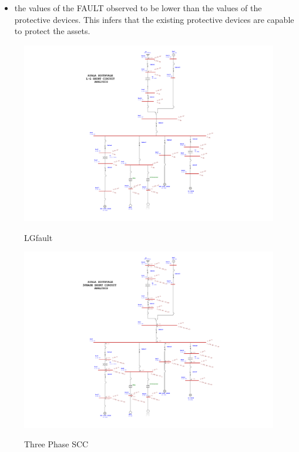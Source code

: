 \begin{itemize}
\item the values of the FAULT observed to be lower than the values of the protective devices. This infers that the existing protective devices are capable to protect the assets.
\end{itemize}

\begin{figure}
%	
	\includegraphics[width=\textwidth]{figures/ASV_shortcircuit_L_GFAULT.pdf} \\
	\caption{LGfault}
	\label{fig_ch04_elecaudit_scc_lgfault} 
\end{figure}

\begin{figure}
	\includegraphics[width=\textwidth]{figures/asv_shortcircuit_3PHASEFAULT.pdf} \\
	\caption{Three Phase SCC}
	\label{fig_ch04_elecaudit_scc_3phase} 
\end{figure}

